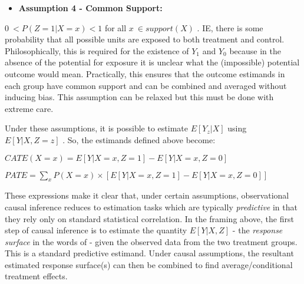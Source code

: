 \documentclass[../main.tex]{subfiles}
\begin{document}
\vspace{\baselineskip}
\begin{itemize}
	\item \textbf{Assumption 4 - Common Support:}
\end{itemize}\par

\begin{adjustwidth}{0.5in}{0.0in}
 \( 0~< P \left( Z=1   \vert  X = x \right)  < 1 \) for all  \( x~ \in support \left( X \right)  \) . IE, there is some probability that all possible units are exposed to both treatment and control. Philosophically, this is required for the existence of  \( Y_{1} \) and  \( Y_{0} \) because in the absence of the potential for exposure it is unclear what the (impossible) potential outcome would mean. Practically, this ensures that the outcome estimands in each group have common support and can be combined and averaged without inducing bias. This assumption can be relaxed but this must be done with extreme care.\par

\end{adjustwidth}


\vspace{\baselineskip}
Under these assumptions, it is possible to estimate  \( E \left[ Y_{z}  \vert  X \right]  \) using  \( E \left[ Y  \vert  X, Z=z \right]  \) . So, the estimands defined above become:\par


\vspace{\baselineskip}
\begin{adjustwidth}{0.5in}{0.0in}
 \( CATE \left( X=x \right)  = E \left[ Y  \vert  X=x, Z=1 \right]  - E \left[ Y  \vert  X=x, Z=0 \right]  \) \par

\end{adjustwidth}


\vspace{\baselineskip}
\begin{adjustwidth}{0.5in}{0.0in}
 \( PATE =  \sum _{x}^{}P \left( X=x \right)   \times  \left[  E \left[ Y  \vert  X=x, Z=1 \right]  - E \left[ Y  \vert  X=x, Z=0 \right]   \right] _{} \) \par

\end{adjustwidth}


\vspace{\baselineskip}
These expressions make it clear that, under certain assumptions, observational causal inference reduces to estimation tasks which are typically \textit{predictive }in that they rely only on standard statistical correlation. In the framing above, the first step of causal inference is to estimate the quantity \( E \left[ Y  \vert  X, Z \right]  \)  - the \textit{response surface} in the words of \cite{Hill2011BayesianInference} - given the observed data from the two treatment groups. This is a standard predictive estimand. Under causal assumptions, the resultant estimated response surface(s) can then be combined to find average/conditional treatment effects.\par
\end{document}
